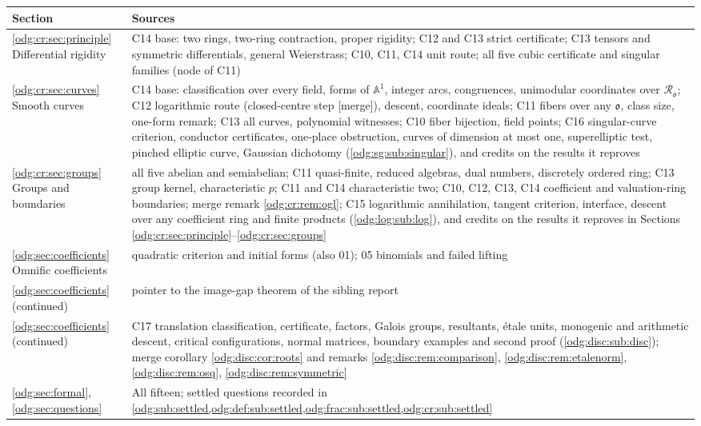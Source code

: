 \documentclass[11pt,oneside]{article}
\numberwithin{equation}{section}
\theoremstyle{definition}
\theoremstyle{remark}
\newcommand{\mergetag}{\textup{\textsf{\small[merge]}}}
\newcommand{\Aff}{\mathbb A}
\begin{document}
\begin{center}
\renewcommand{\arraystretch}{1.15}
\begin{tabular}{>{\raggedright\arraybackslash}p{}>{\raggedright\arraybackslash}p{}}
\toprule
Section & Sources\\
\midrule
\ref{odg:cr:sec:principle} Differential rigidity & C14 base: two rings, two-ring
contraction, proper rigidity; C12 and C13 strict certificate; C13 tensors and
symmetric differentials, general Weierstrass; C10, C11, C14 unit route; all five
cubic certificate and singular families (node of C11)\\
\ref{odg:cr:sec:curves} Smooth curves & C14 base: classification over every field,
forms of $\Aff^1$, integer arcs, congruences, unimodular coordinates over
$\mathcal R_{\mathfrak o}$; C12 logarithmic route (closed-centre step \mergetag),
descent, coordinate ideals; C11 fibers over any $\mathfrak o$, class size, one-form
remark; C13 all curves, polynomial witnesses; C10 fiber bijection, field points; C16
singular-curve criterion, conductor certificates, one-place obstruction, curves of dimension
at most one, superelliptic test, pinched elliptic curve, Gaussian dichotomy
(\ref{odg:sg:sub:singular}), and credits on the results it reproves\\
\ref{odg:cr:sec:groups} Groups and boundaries & all five abelian and semiabelian;
C11 quasi-finite, reduced algebras, dual numbers, discretely ordered ring; C13 group
kernel, characteristic $p$; C11 and C14 characteristic two; C10, C12, C13, C14
coefficient and valuation-ring boundaries; merge remark \ref{odg:cr:rem:ogl}; C15
logarithmic annihilation, tangent criterion, interface, descent over any coefficient ring
and finite products (\ref{odg:log:sub:log}), and credits on the results it reproves in
Sections \ref{odg:cr:sec:principle}--\ref{odg:cr:sec:groups}\\
\ref{odg:sec:coefficients} Omnific coefficients & 02 quadratic criterion and
initial forms (also 01); 05 binomials and failed lifting\\
\ref{odg:sec:coefficients} (continued) & pointer to the image-gap theorem of
the sibling report\\
\ref{odg:sec:coefficients} (continued) & C17 translation classification, certificate,
factors, Galois groups, resultants, \'etale units, monogenic and arithmetic descent,
critical configurations, normal matrices, boundary examples and second proof
(\ref{odg:disc:sub:disc}); merge corollary \ref{odg:disc:cor:roots} and remarks
\ref{odg:disc:rem:comparison}, \ref{odg:disc:rem:etalenorm}, \ref{odg:disc:rem:osq},
\ref{odg:disc:rem:symmetric}\\
\ref{odg:sec:formal}, \ref{odg:sec:questions} & All fifteen; settled
questions recorded in
\cref{odg:sub:settled,odg:def:sub:settled,odg:frac:sub:settled,odg:cr:sub:settled}\\
\bottomrule
\end{tabular}
\end{center}
\end{document}
